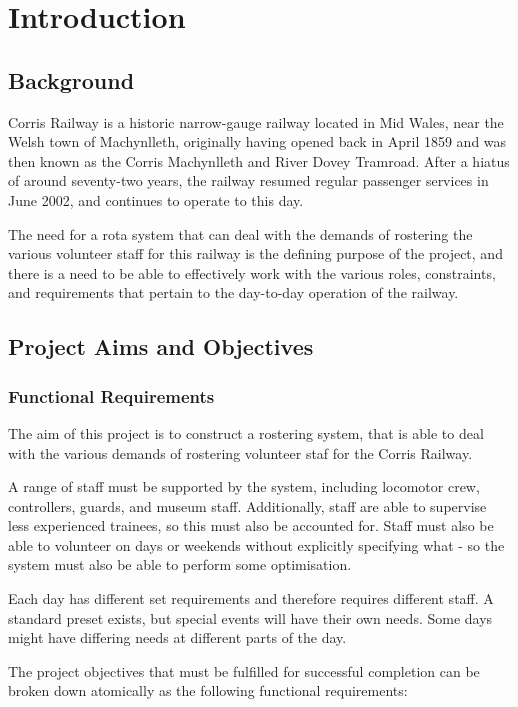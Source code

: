 \chapter{Introduction}

\section{Background}
Corris Railway is a historic narrow-gauge railway located in Mid Wales, near the Welsh town of Machynlleth, originally having opened back in April 1859 and was then known as the Corris Machynlleth and River Dovey Tramroad. \cite{DEVEREAUX01} After a hiatus of around seventy-two years, the railway resumed regular passenger services in June 2002, and continues to operate to this day. \cite{CORRISSOCIETY1}

The need for a rota system that can deal with the demands of rostering the various volunteer staff for this railway is the defining purpose of the project, and there is a need to be able to effectively work with the various roles, constraints, and requirements that pertain to the day-to-day operation of the railway. 

\section{Project Aims and Objectives}
\subsection{Functional Requirements}
The aim of this project is to construct a rostering system, that is able to deal with the various demands of rostering volunteer staf for the Corris Railway. 

A range of staff must be supported by the system, including locomotor crew, controllers, guards, and museum staff. Additionally, staff are able to supervise less experienced trainees, so this must also be accounted for. Staff must also be able to volunteer on days or weekends without explicitly specifying what - so the system must also be able to perform some optimisation.

Each day has different set requirements and therefore requires different staff. A standard preset exists, but special events will have their own needs. Some days might have differing needs at different parts of the day.

The project objectives that must be fulfilled for successful completion can be broken down atomically as the following functional requirements:

